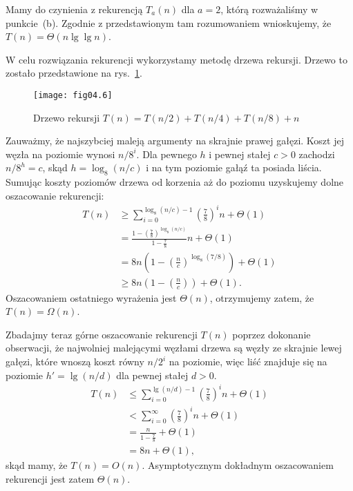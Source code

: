 \subproblem %
Mamy do czynienia z rekurencją $T_a(n)$ dla $a=2$, którą rozważaliśmy w punkcie~(b). Zgodnie z przedstawionym tam rozumowaniem wnioskujemy, że $T(n)=\Theta(n\lg\lg n)$.

\subproblem %
W celu rozwiązania rekurencji wykorzystamy metodę drzewa rekursji. Drzewo to zostało przedstawione na rys.~\ref{fig:4-4f}.
\begin{figure}[ht]
	\begin{center}
		\texttt{[image: fig04.6]}
	\end{center}
	\caption{Drzewo rekursji $T(n)=T(n/2)+T(n/4)+T(n/8)+n$} \label{fig:4-4f}
\end{figure}

Zauważmy, że najszybciej maleją argumenty na skrajnie prawej gałęzi. Koszt jej węzła na  poziomie wynosi $n/8^i$. Dla pewnego $h$ i pewnej stałej $c>0$ zachodzi $n/8^h=c$, skąd $h=\log_8(n/c)$ i na tym poziomie gałąź ta posiada liścia. Sumując koszty poziomów drzewa od korzenia aż do  poziomu uzyskujemy dolne oszacowanie rekurencji:
\begin{align*}
	T(n) &\ge \sum_{i=0}^{\log_8(n/c)-1}\left(\frac{7}{8}\right)^in+\Theta(1) \\
	&= \frac{1-\left(\frac{7}{8}\right)^{\log_8(n/c)}}{1-\frac{7}{8}}n+\Theta(1) \\
	&= 8n\left(1-\left(\frac{n}{c}\right)^{\log_8(7/8)}\right)+\Theta(1) \\
	&\ge 8n\left(1-\left(\frac{n}{c}\right)\right)+\Theta(1).
\end{align*}
Oszacowaniem ostatniego wyrażenia jest $\Theta(n)$, otrzymujemy zatem, że $T(n)=\Omega(n)$.

Zbadajmy teraz górne oszacowanie rekurencji $T(n)$ poprzez dokonanie obserwacji, że najwolniej malejącymi węzłami drzewa są węzły ze skrajnie lewej gałęzi, które wnoszą koszt równy $n/2^i$ na  poziomie, więc liść znajduje się na poziomie $h'=\lg(n/d)$ dla pewnej stałej $d>0$.
\begin{align*}
	T(n) &\le \sum_{i=0}^{\lg(n/d)-1}\left(\frac{7}{8}\right)^in+\Theta(1) \\
	&< \sum_{i=0}^\infty\left(\frac{7}{8}\right)^in+\Theta(1) \\
	&= \frac{n}{1-\frac{7}{8}}+\Theta(1) \\
	&= 8n+\Theta(1),
\end{align*}
skąd mamy, że $T(n)=O(n)$. Asymptotycznym dokładnym oszacowaniem rekurencji jest zatem $\Theta(n)$.

